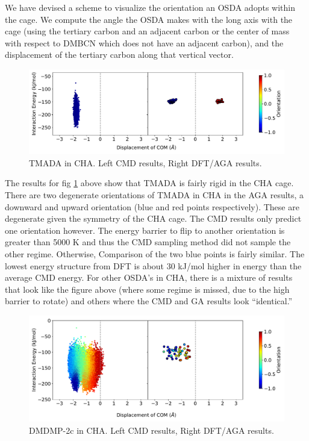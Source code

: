 \documentclass[journal=accacs,manuscript=article, email=true, layout=traditional]{achemso}
\begin{document}
We have devised a scheme to visualize the orientation an OSDA adopts within the cage. We compute the angle the OSDA makes with the long axis with the cage (using the tertiary carbon and an adjacent carbon or the center of mass with respect to DMBCN which does not have an adjacent carbon), and the displacement of the tertiary carbon along that vertical vector. 

\begin{figure}
\begin{center}

\includegraphics[scale=.5]{./Figures/CHA-GA-CMD-TMADA.pdf}
\caption{TMADA in CHA. Left CMD results, Right DFT/AGA results.} 
\label{fig:TMADA-CHA} 

\end{center}
\end{figure}

The results for fig \ref{fig:TMADA-CHA} above show that TMADA is fairly rigid in the CHA cage. There are two degenerate orientations of TMADA in CHA in the AGA results, a downward and upward orientation (blue and red points respectively). These are degenerate given the symmetry of the CHA cage. The CMD results only predict one orientation however. The energy barrier to flip to another orientation is greater than 5000 K and thus the CMD sampling method did not sample the other regime. Otherwise, Comparison of the two blue points is fairly similar. The lowest energy structure from DFT is about 30 kJ/mol higher in energy than the average CMD energy. For other OSDA's in CHA, there is a mixture of results that look like the figure above (where some regime is missed, due to the high barrier to rotate) and others where the CMD and GA results look ``identical.''

\begin{figure}
\begin{center}

\includegraphics[scale=.5]{./Figures/AEI-GA-CMD-DMDMP_2c.pdf}
\caption{DMDMP-2c in CHA. Left CMD results, Right DFT/AGA results.} 
\label{fig:DMDMP-2c-AEI} 

\end{center}
\end{figure}
\end{document}
